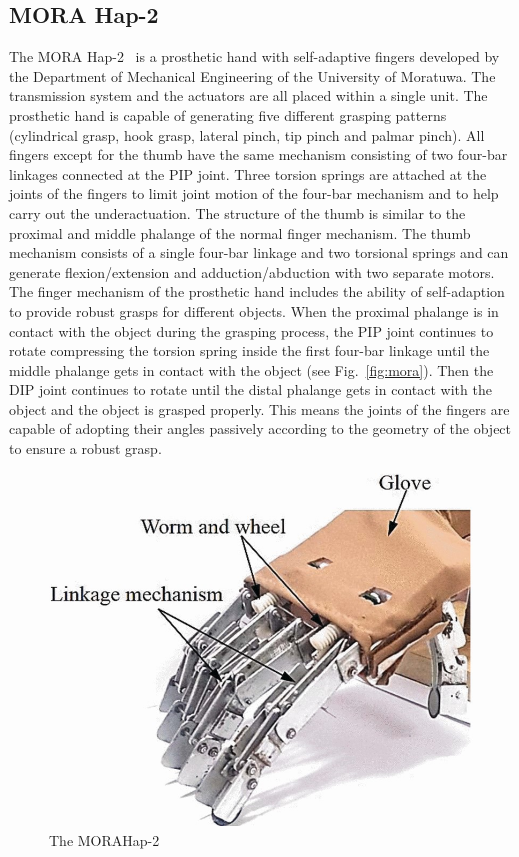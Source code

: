 \documentclass[a4paper, 10pt, conference]{ieeeconf}      %
\begin{document}
\subsection{MORA Hap-2}

The MORA Hap-2~\cite{morahap2} is a prosthetic hand with self-adaptive fingers developed by the Department of Mechanical Engineering of the University of Moratuwa. The transmission system and the actuators are all placed within a single unit. The prosthetic hand is capable of generating five different grasping patterns (cylindrical grasp, hook grasp, lateral pinch, tip pinch and palmar pinch). All fingers except for the thumb have the same mechanism consisting of two four-bar linkages connected at the PIP joint. Three torsion springs are attached at the joints of the fingers to limit joint motion of the four-bar mechanism and to help carry out the underactuation. The structure of the thumb is similar to the proximal and middle phalange of the normal finger mechanism. The thumb mechanism consists of a single four-bar linkage and two torsional springs and can generate flexion/extension and adduction/abduction with two separate motors. The finger mechanism of the prosthetic hand includes the ability of self-adaption to provide robust grasps for different objects. When the proximal phalange is in contact with the object during the grasping process, the PIP joint continues to rotate compressing the torsion spring inside the first four-bar linkage until the middle phalange gets in contact with the object (see Fig.~\ref{fig:mora}). Then the DIP joint continues to rotate until the distal phalange gets in contact with the object and the object is grasped properly. This means the joints of the fingers are capable of adopting their angles passively according to the geometry of the object to ensure a robust grasp.

\begin{figure}[h]

	\centering
	\includegraphics[scale=0.32]{images/MORAHap-2}
	
	\caption{The MORAHap-2}
\end{figure}
\end{document}

